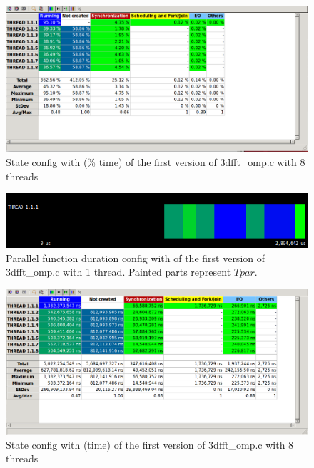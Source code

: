 \documentclass[12]{article}
\begin{document}
\begin{figure}[H]
\centering  
\includegraphics[scale=0.5]{images/3dfft/8threadsPercentage.PNG}
    \caption{State config with (\% time) of the first version of 3dfft\_omp.c with 8 threads}
\end{figure}
        
\begin{figure}[H]
\centering  
\includegraphics[scale=0.5]{images/3dfft/parallelFunction.PNG}
    \caption{Parallel function duration config with of the first version of 3dfft\_omp.c with 1 thread. Painted parts represent $T{par}$.}
\end{figure}

\begin{figure}[H]
\centering  
\includegraphics[scale=0.5]{images/3dfft/8threads.PNG}
    \caption{State config with (time) of the first version of 3dfft\_omp.c with 8 threads}
\end{figure}
        
    
\end{document}
